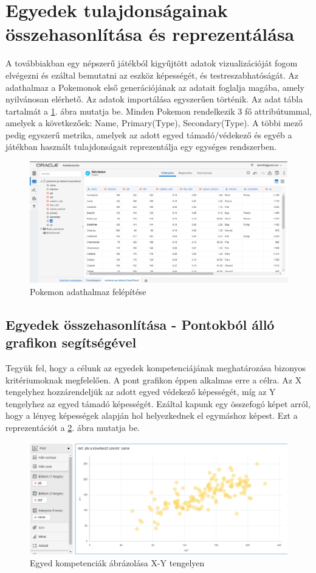 \section{Egyedek tulajdonságainak összehasonlítása és reprezentálása}
A továbbiakban egy népszerű játékból kigyűjtött adatok vizualizációját fogom elvégezni és ezáltal bemutatni az eszköz képességét, és testreszabhatóságát. Az adathalmaz a Pokemonok első generációjának az adatait foglalja magába, amely nyilvánosan elérhető. Az adatok importálása egyszerűen történik. Az adat tábla tartalmát a \ref{fig:pokedata}. ábra mutatja be. Minden Pokemon rendelkezik 3 fő attribútummal, amelyek a következőek: Name, Primary(Type), Secondary(Type). A többi mező pedig egyszerű metrika, amelyek az adott egyed támadó/védekező és egyéb a játékban használt tulajdonságait reprezentálja egy egységes rendszerben. 

\begin{figure}[h!]
	\centering
	\includegraphics[width=1.0\linewidth]{dani_imgs/poke_data}
	\caption{Pokemon adathalmaz felépítése}
	\label{fig:pokedata}
\end{figure}

	\subsection{Egyedek összehasonlítása - Pontokból álló grafikon segítségével}
	Tegyük fel, hogy a célunk az egyedek kompetenciájának meghatározása bizonyos kritériumoknak megfelelően. A pont grafikon éppen alkalmas erre a célra. Az X tengelyhez hozzárendeljük az adott egyed védekező képességét, míg az Y tengelyhez az egyed támadó képességét. Ezáltal kapunk egy összefogó képet arról, hogy a lényeg képességek alapján hol helyezkednek el egymáshoz képest. Ezt a reprezentációt a \ref{fig:pokedata1}. ábra mutatja be.
	\begin{figure}[h!]
		\centering
		\includegraphics[width=0.85\linewidth]{dani_imgs/poke_data1}
		\caption{Egyed kompetenciák ábrázolása X-Y tengelyen}
		\label{fig:pokedata1}
	\end{figure}
	
